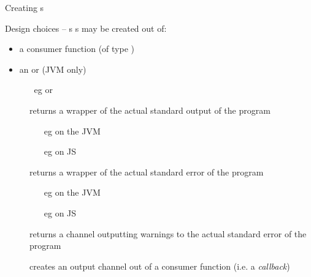 \documentclass[handout]{beamer}
\begin{document}
\begin{frame}[allowframebreaks]{Creating s}
    \begin{block}{Design choices -- s}
        s may be created out of:
        \begin{itemize}
            \item a \alert{consumer} function (of type \alert{})
            \item an  or  (JVM only)
            \begin{itemize}
                \item[eg]  or 
            \end{itemize}
        \end{itemize}
    \end{block}
    \begin{description}
        \item[] returns a wrapper of the actual standard output of the program
        \begin{itemize}\small
            \item[eg]  on the JVM
            \item[eg]  on JS
        \end{itemize}
        \item[] returns a wrapper of the actual standard error of the program
        \begin{itemize}\small
            \item[eg]  on the JVM
            \item[eg]  on JS
        \end{itemize}
        \item[] returns a channel outputting warnings to the actual standard error of the program
        \item[] creates an output channel out of a consumer function (i.e. a \emph{callback})
    \end{description}

\end{frame}
\end{document}
